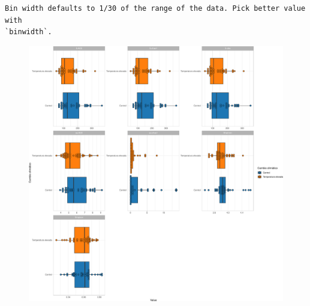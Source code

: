 \documentclass[
  letterpaper,
  DIV=11,
  numbers=noendperiod]{scrartcl}
\begin{document}
\begin{verbatim}
Bin width defaults to 1/30 of the range of the data. Pick better value with
`binwidth`.
\end{verbatim}

\begin{figure}[H]

{\centering \includegraphics{InformeNeiker_files/figure-pdf/unnamed-chunk-7-1.pdf}

}

\end{figure}
\end{document}
